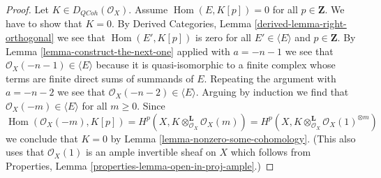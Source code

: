\documentclass{amsart}
\theoremstyle{plain}
\theoremstyle{definition}
\theoremstyle{remark}
\numberwithin{equation}{subsection}
\def\Hom{\mathop{\mathrm{Hom}}\nolimits}
\def\QCoh{\mathit{QCoh}}
\begin{document}
\begin{proof}
Let $K \in D_\QCoh(\mathcal{O}_X)$. Assume
$\Hom(E, K[p]) = 0$ for all $p \in \mathbf{Z}$.
We have to show that $K = 0$.
By Derived Categories, Lemma
\ref{derived-lemma-right-orthogonal}
we see that $\Hom(E', K[p])$ is zero for all $E' \in \langle E \rangle$
and $p \in \mathbf{Z}$.
By Lemma \ref{lemma-construct-the-next-one}
applied with $a = -n - 1$
we see that $\mathcal{O}_X(-n - 1) \in \langle E \rangle$
because it is quasi-isomorphic to a finite complex
whose terms are finite direct sums of summands of $E$.
Repeating the argument with $a = -n - 2$ we see that
$\mathcal{O}_X(-n - 2) \in \langle E \rangle$.
Arguing by induction we find that $\mathcal{O}_X(-m) \in \langle E \rangle$
for all $m \geq 0$.
Since
$$
\Hom(\mathcal{O}_X(-m), K[p]) =
H^p(X, K \otimes_{\mathcal{O}_X}^\mathbf{L} \mathcal{O}_X(m)) =
H^p(X, K \otimes_{\mathcal{O}_X}^\mathbf{L} \mathcal{O}_X(1)^{\otimes m})
$$
we conclude that $K = 0$ by Lemma \ref{lemma-nonzero-some-cohomology}.
(This also uses that $\mathcal{O}_X(1)$ is an ample
invertible sheaf on $X$ which follows from
Properties, Lemma \ref{properties-lemma-open-in-proj-ample}.)
\end{proof}
\end{document}
